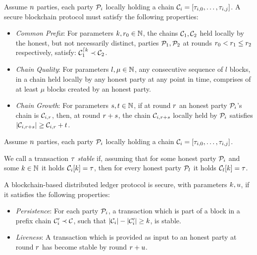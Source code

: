 \begin{definition}\label{def:blockchain-extended}
    Assume $n$ parties, each party $\mathcal{P}_i$ locally holding a chain
    $\mathcal{C}_i = [\tau_{i, 0}, \dots, \tau_{i, j}]$. A secure blockchain protocol
    must satisfy the following properties:
    \begin{itemize}
        \item \emph{Common Prefix}: For parameters $k, r_0
            \in \mathbb{N}$, the chains $\mathcal{C}_1, \mathcal{C}_2$ held locally by the
            honest, but not necessarily distinct, parties $\mathcal{P}_1, \mathcal{P}_2$
            at rounds $r_0 < r_1 \leq r_2$ respectively,
            satisfy: $\mathcal{C}_1^{\lceil k} \prec \mathcal{C}_2$.
        \item \emph{Chain Quality}: For parameters $l, \mu \in \mathbb{N}$, any
            consecutive sequence of $l$ blocks, in a chain held locally by any
            honest party at any point in time, comprises of at least $\mu$
            blocks created by an honest party.
        \item \emph{Chain Growth}: For parameters $s, t \in \mathbb{N}$, if at
            round $r$ an honest party $\mathcal{P}_i$'s chain is
            $\mathcal{C}_{i, r}$, then, at round $r + s$, the chain
            $\mathcal{C}_{i, r + s}$ locally held by $\mathcal{P}_i$ satisfies
            $|\mathcal{C}_{i, r + s}| \geq \mathcal{C}_{i, r} + t$.
    \end{itemize}
\end{definition}

\begin{definition}\label{def:blockchain}
    Assume $n$ parties, each party $\mathcal{P}_i$ locally holding a chain
    $\mathcal{C}_i = [\tau_{i, 0}, \dots, \tau_{i, j}]$.

    We call a transaction $\tau$ \emph{stable} if, assuming that for some honest
    party $\mathcal{P}_i$ and some $k \in \mathbb{N}$ it holds $\mathcal{C}_i[k] = \tau$,
    then for every honest party $\mathcal{P}_l$ it holds $\mathcal{C}_l[k] = \tau$.

    A blockchain-based distributed ledger protocol is secure, with parameters
    $k, u$, if it satisfies the following properties:
    \begin{itemize}
        \item \emph{Persistence}:
            For each party $\mathcal{P}_i$, a transaction which is part of a block
            in a prefix chain $\mathcal{C}_i' \prec \mathcal{C}$, such that $|\mathcal{C}_i| -
            |\mathcal{C}_i'| \geq k$, is stable.
        \item \emph{Liveness}:
            A transaction which is provided as input to an honest party at
            round $r$ has become stable by round $r + u$.
    \end{itemize}
\end{definition}

